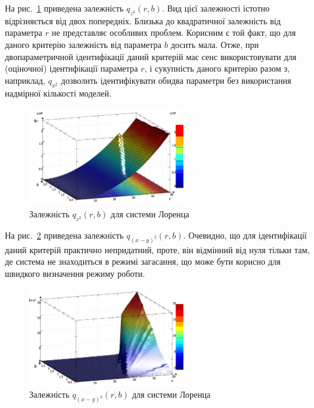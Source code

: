 На рис.~\ref{atu:f:lor_qz2_r_b} приведена залежність
$q_{z^2}(r,b)$.
Вид цієї залежності істотно відрізняється від двох попередніх.
Близька до квадратичної залежність від параметра $r$ не представляє особливих
проблем. Корисним є той факт, що для даного критерію залежність від параметра $b$
досить мала. Отже, при двопараметричной ідентифікації даний критерій має
сенс використовувати для (оціночної) ідентифікації параметра $r$, і
сукупність даного критерію разом з, наприклад, $q_{x^2}$ дозволить
ідентифікувати обидва параметри без використання надмірної кількості моделей.

\begin{figure}[ht!]
  \begin{center}
    \includegraphics[width=0.60\textwidth]{p/cha/lor/q2d/lor_qz2_r_b.png}
  \end{center}
  \caption{Залежність $ q_{z^2} (r, b) $ для системи Лоренца}
  \label{atu:f:lor_qz2_r_b}
\end{figure}

На рис.~\ref{atu:f:lor_qxmy2_r_b} приведена залежність
$q_{(x-y)^2}(r,b)$.
Очевидно, що для ідентифікації даний критерій практично
непридатний, проте, він відмінний від нуля тільки там, де система
не знаходиться в режимі загасання, що може бути корисно для
швидкого визначення режиму роботи.

\begin{figure}[ht!]
  \begin{center}
    \includegraphics[width=0.60\textwidth]{p/cha/lor/q2d/lor_qxmy2_r_b.png}
  \end{center}
  \caption{Залежність $ q_{(x-y)^2} (r, b) $ для системи Лоренца}
  \label{atu:f:lor_qxmy2_r_b}
\end{figure}


